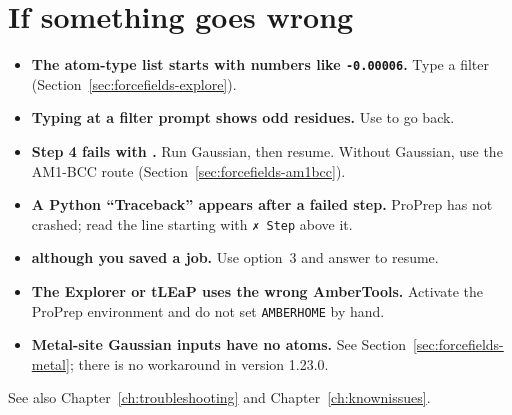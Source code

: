 \section{If something goes wrong}
\label{sec:forcefields-problems}

\begin{itemize}\sloppy
  \item \textbf{The atom-type list starts with numbers like
    \texttt{-0.00006}.} Type a filter (Section~\ref{sec:forcefields-explore}).
  \item \textbf{Typing  at a filter prompt shows odd residues.}
    Use  to go back.
  \item \textbf{Step 4 fails with .} Run
    Gaussian, then resume. Without Gaussian, use the AM1-BCC route
    (Section~\ref{sec:forcefields-am1bcc}).
  \item \textbf{A Python ``Traceback'' appears after a failed step.} ProPrep
    has not crashed; read the line starting with \texttt{✗ Step} above it.
  \item \textbf{ although you saved a
    job.} Use option~3 and answer  to resume.
  \item \textbf{The Explorer or tLEaP uses the wrong AmberTools.} Activate the
    ProPrep environment and do not set \texttt{AMBERHOME} by hand.
  \item \textbf{Metal-site Gaussian inputs have no atoms.} See
    Section~\ref{sec:forcefields-metal}; there is no workaround in version
    1.23.0.
\end{itemize}

See also Chapter~\ref{ch:troubleshooting} and Chapter~\ref{ch:knownissues}.
